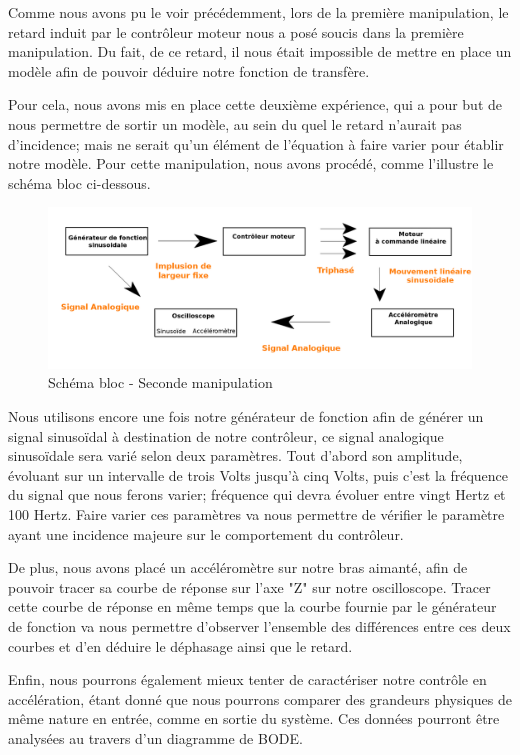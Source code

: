 \documentclass[french,a4paper,12pt]{report}
\begin{document}
		Comme nous avons pu le voir précédemment, lors de la première manipulation, le retard induit par le contrôleur moteur nous a posé soucis dans la première manipulation. Du fait, de ce retard, il nous était impossible de mettre en place un modèle afin de pouvoir déduire notre fonction de transfère.
		
		Pour cela, nous avons mis en place cette deuxième expérience, qui a pour but de nous permettre de sortir un modèle, au sein du quel le retard n'aurait pas d'incidence; mais ne serait qu'un élément de l'équation à faire varier pour établir notre modèle. Pour cette manipulation, nous avons procédé, comme l'illustre le schéma bloc ci-dessous.		
		
	\begin{figure}[!ht]
    \center
  	\includegraphics[width=18cm]{manip2.png}
    \caption{Schéma bloc - Seconde manipulation}
	\end{figure}	
	
	Nous utilisons encore une fois notre générateur de fonction afin de générer un signal sinusoïdal à destination de notre contrôleur, ce signal analogique sinusoïdale sera varié selon deux paramètres. Tout d'abord son amplitude, évoluant sur un intervalle de trois Volts jusqu'à cinq Volts, puis c'est la fréquence du signal que nous ferons varier; fréquence qui devra évoluer entre vingt Hertz et 100 Hertz.	Faire varier ces paramètres va nous permettre de vérifier le paramètre ayant une incidence majeure sur le comportement du contrôleur.
	
	De plus, nous avons placé un accéléromètre sur notre bras aimanté, afin de pouvoir tracer sa courbe de réponse sur l'axe "Z" sur notre oscilloscope. Tracer cette courbe de réponse en même temps que la courbe fournie par le générateur de fonction va nous permettre d'observer l'ensemble des différences entre ces deux courbes et d'en déduire le déphasage ainsi que le retard.
	
	Enfin, nous pourrons également mieux tenter de caractériser notre contrôle en accélération, étant donné que nous pourrons comparer des grandeurs physiques de même nature en entrée, comme en sortie du système. Ces données pourront être analysées au travers d'un diagramme de BODE.
	
\end{document}
